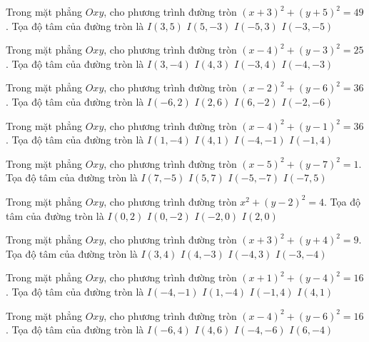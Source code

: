 \begin{ex}
Trong mặt phẳng $Oxy$, cho phương trình đường tròn $(x + 3)^2  + (y + 5)^2 = 49$. Tọa độ tâm của đường tròn là
\choice
{ $I(3, 5)$ }
{ $I(5, -3)$ }
{ $I(-5, 3)$ }
{ \True $I(-3, -5)$ }
\end{ex}

\begin{ex}
Trong mặt phẳng $Oxy$, cho phương trình đường tròn $(x -4)^2   + (y -3)^2 = 25$. Tọa độ tâm của đường tròn là
\choice
{ $I(3, -4)$ }
{ \True $I(4, 3)$ }
{ $I(-3, 4)$ }
{ $I(-4, -3)$ }
\end{ex}

\begin{ex}
Trong mặt phẳng $Oxy$, cho phương trình đường tròn $(x -2)^2   + (y -6)^2 = 36$. Tọa độ tâm của đường tròn là
\choice
{ $I(-6, 2)$ }
{ \True $I(2, 6)$ }
{ $I(6, -2)$ }
{ $I(-2, -6)$ }
\end{ex}

\begin{ex}
Trong mặt phẳng $Oxy$, cho phương trình đường tròn $(x -4)^2   + (y -1)^2 = 36$. Tọa độ tâm của đường tròn là
\choice
{ $I(1, -4)$ }
{ \True $I(4, 1)$ }
{ $I(-4, -1)$ }
{ $I(-1, 4)$ }
\end{ex}

\begin{ex}
Trong mặt phẳng $Oxy$, cho phương trình đường tròn $(x -5)^2   + (y -7)^2 = 1$. Tọa độ tâm của đường tròn là
\choice
{ $I(7, -5)$ }
{ \True $I(5, 7)$ }
{ $I(-5, -7)$ }
{ $I(-7, 5)$ }
\end{ex}

\begin{ex}
Trong mặt phẳng $Oxy$, cho phương trình đường tròn $x^2 + (y -2)^2 = 4$. Tọa độ tâm của đường tròn là
\choice
{ \True $I(0, 2)$ }
{ $I(0, -2)$ }
{ $I(-2, 0)$ }
{ $I(2, 0)$ }
\end{ex}

\begin{ex}
Trong mặt phẳng $Oxy$, cho phương trình đường tròn $(x + 3)^2  + (y + 4)^2 = 9$. Tọa độ tâm của đường tròn là
\choice
{ $I(3, 4)$ }
{ $I(4, -3)$ }
{ $I(-4, 3)$ }
{ \True $I(-3, -4)$ }
\end{ex}

\begin{ex}
Trong mặt phẳng $Oxy$, cho phương trình đường tròn $(x + 1)^2  + (y -4)^2 = 16$. Tọa độ tâm của đường tròn là
\choice
{ $I(-4, -1)$ }
{ $I(1, -4)$ }
{ \True $I(-1, 4)$ }
{ $I(4, 1)$ }
\end{ex}

\begin{ex}
Trong mặt phẳng $Oxy$, cho phương trình đường tròn $(x -4)^2   + (y -6)^2 = 16$. Tọa độ tâm của đường tròn là
\choice
{ $I(-6, 4)$ }
{ \True $I(4, 6)$ }
{ $I(-4, -6)$ }
{ $I(6, -4)$ }
\end{ex}

